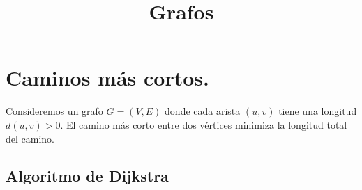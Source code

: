 \documentclass[12pt, letterpaper, twoside]{article}
\title{Grafos}
\begin{document}
\section{Caminos más cortos.}

Consideremos un grafo $G = (V, E)$ donde cada arista $(u, v)$ tiene una longitud $d(u,v) > 0$. El camino más corto entre dos vértices minimiza la longitud total del camino.


\subsection{Algoritmo de Dijkstra}
\end{document}

